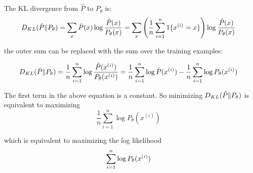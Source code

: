 \begin{answer}

The KL divergence from \(\hat{P}\) to \(P_\theta\) is:
\begin{equation}
    D_{KL}(\hat{P} \| P_\theta) = \sum_x \hat{P}(x) \log \frac{\hat{P}(x)}{P_\theta(x)} = \sum_x \left( \frac{1}{n} \sum_{i=1}^{n} 1\{x^{(i)} = x\} \right) \log \frac{\hat{P}(x)}{P_\theta(x)}
\end{equation}

the outer sum can be replaced with the sum over the training examples:

\begin{equation}
    D_{KL}(\hat{P} \| P_\theta) = \frac{1}{n} \sum_{i=1}^{n} \log \frac{\hat{P}(x^{(i)})}{P_\theta(x^{(i)})} = \frac{1}{n} \sum_{i=1}^{n} \log \hat{P}(x^{(i)}) - \frac{1}{n} \sum_{i=1}^{n} \log P_\theta(x^{(i)})
\end{equation}

The first term in the above equation is a constant. So minimizing $ D_{KL}(\hat{P}\|P_\theta)$ is equivalent to maximizing 
\begin{equation}
    \frac{1}{n} \sum_{i=1}^{n} \log P_\theta(x^{(i)})
\end{equation}

which is equivalent to maximizing the log likelihood
\begin{equation}
    \sum_{i=1}^{n} \log P_\theta(x^{(i)})
\end{equation}
\end{answer}
